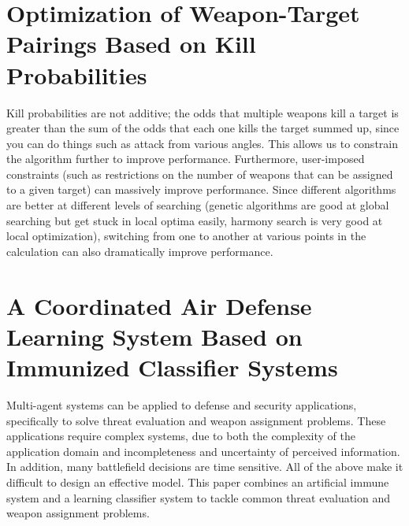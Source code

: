 \documentclass[12pt]{article} %
\begin{document}
\section*{Optimization of Weapon-Target Pairings Based on Kill Probabilities \cite{killProbs_bogdanowicz_2013}}
    Kill probabilities are not additive; the odds that multiple weapons kill a target is greater than the sum of the odds that each one kills the target summed up, since you can do things such as attack from various angles. This allows us to constrain the algorithm further to improve performance. Furthermore, user-imposed constraints (such as restrictions on the number of weapons that can be assigned to a given target) can massively improve performance. Since different algorithms are better at different levels of searching (genetic algorithms are good at global searching but get stuck in local optima easily, harmony search is very good at local optimization), switching from one to another at various points in the calculation can also dramatically improve performance.   

\section*{A Coordinated Air Defense Learning System Based on Immunized Classifier Systems \cite{immunized_nantogma_2021}}
    
    Multi-agent systems can be applied to defense and security applications, specifically to solve threat evaluation and weapon assignment problems. These applications require complex systems, due to both the complexity of the application domain and incompleteness and uncertainty of perceived information. In addition, many battlefield decisions are time sensitive. All of the above make it difficult to design an effective model. This paper combines an artificial immune system and a learning classifier system to tackle common threat evaluation and weapon assignment problems. 
    
\end{document}
